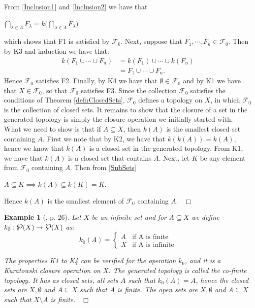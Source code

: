 \documentclass[12pt, oneside]{book}
\newtheorem{example}[theorem]{Example}
\newcommand{\qed}{\hfill ~$\Box$\\}
\newcommand{\powerset}{\raisebox{.15\baselineskip}{\Large\ensuremath{\wp}}}
\begin{document}
From \eqref{Inclusion1} and \eqref{Inclusion2} we have that
\begin{center}
$\bigcap\limits_{\lambda \in \Lambda} F_{\lambda} = k\bigg(\bigcap\limits_{\lambda \in \Lambda} F_{\lambda}\bigg)$
\end{center}
which shows that F1 is satisfied by $\mathscr{F}_0$.
\vskip 0.3cm
\noindent Next, suppose that $F_1, \cdots, F_n \in \mathscr{F}_0$. Then by K3 and induction we have that:
\begin{align*}
k(F_1 \cup \cdots \cup F_n) 
&= k(F_1) \cup \cdots \cup k(F_n)\\
&= F_1 \cup \cdots \cup F_n.
\end{align*}
Hence $\mathscr{F}_0$ satisfies F2.
\vskip 0.3cm
\noindent Finally, by K4 we have that $\emptyset \in \mathscr{F}_0$ and by K1 we have 
that $X \in \mathscr{F}_0$, so that $\mathscr{F}_0$ satisfies F3. Since the collection $\mathscr{F}_0$
satisfies the conditions of Theorem \ref{defnClosedSets}, $\mathscr{F}_0$ defines a topology on $X$, 
in which $\mathscr{F}_0$ is the collection of closed sets.
\vskip 0.3cm
\noindent It remains to show that the closure of a set in the generated topology is simply the 
closure operation we initially started with. 
What we need to show is that if $A \subseteq X$, then $k(A)$ is the smallest closed set containing $A$. 
\vskip 0.3cm
\noindent First we note that by K2, we have that $k(k(A)) = k(A)$, hence we know that $k(A)$ is a 
closed set in the generated topology. From K1, we have that $k(A)$ is a closed set that contains $A$. 
Next, let $K$ be any element from $\mathscr{F}_0$ containing $A$. 
Then from \eqref{SubSets} 
\begin{center}
$A \subseteq K \implies k(A) \subseteq k(K) = K$. 
\end{center}
Hence $k(A)$ is the smallest element of $\mathscr{F}_0$ containing $A$.
\qed

\begin{example} [\cite{W2}, p. 26] \label{cofiniteTopology}
\normalfont
\noindent 
Let $X$ be an infinite set and for $A \subseteq X$ we define \\
$k_0 : \powerset(X) \rightarrow \powerset(X)$ as:
\[ 
k_0(A) =
\begin{cases} 
      A & \text{if A is finite}\\
      X & \text{if A is infinite} 
   \end{cases}
\]

\noindent The properties K1 to K4 can be verified for the operation $k_0$, and it is a 
Kuratowski closure operation on $X$. The generated topology is called the 
{\sl co-finite topology}. It has as closed sets, all sets $A$ such that $k_0(A) = A$, hence the closed sets are $X, \emptyset$ and $A \subseteq X$ 
such that $A$ is finite. The open sets are $X, \emptyset$ and $A \subseteq X$ such 
that $X \setminus A$ is finite.
\qed
\end{example}
\vspace{-1cm}
\end{document}
